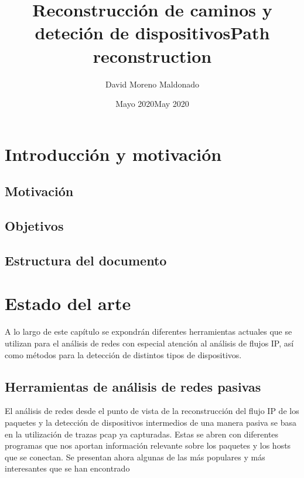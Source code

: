 \documentclass[twoside, 12pt]{epstfg}
\title[spa]{Reconstrucción de caminos y deteción de dispositivos}
\title[eng]{Path reconstruction}
\author{David Moreno Maldonado}
\date[spa]{Mayo 2020}
\date[eng]{May 2020}
\begin{document}

\frontmatter

\maketitle[spa]

\makeinnertitle[spa]


\tableofcontents
\clearpage
\listoftables
\clearpage
\listoffigures
\cleardoublepage

\printnoidxglossaries

\mainmatter

\chapter{Introducción y motivación}

\section{Motivación}

\section{Objetivos}

\section{Estructura del documento}


\chapter{Estado del arte}
A lo largo de este capítulo se expondrán diferentes herramientas actuales que se utilizan para el análisis de redes con especial atención al análisis de flujos IP, así como métodos para la detección de distintos tipos de dispositivos.

\section{Herramientas de análisis de redes pasivas}
El análisis de redes desde el punto de vista de la reconstrucción del flujo IP de los paquetes y la detección de dispositivos intermedios de una manera pasiva se basa en la utilización de trazas pcap ya capturadas. Estas se abren con diferentes programas que nos aportan información relevante sobre los paquetes y los hosts que se conectan. Se presentan ahora algunas de las más populares y más interesantes que se han encontrado \cite{Gandhi2014} \cite{bestNetAna}
\end{document}
